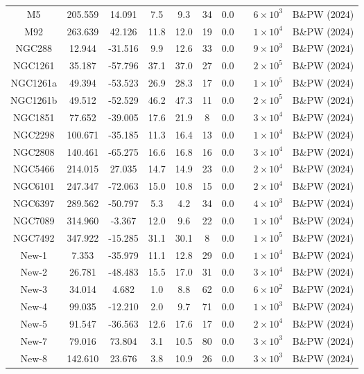 \begin{table}
\begin{tabular}{cSSSSSSccc}
M5 & 205.559 & 14.091 & 7.5 & 9.3 & 34 & 0.0 & \citet{ibata:2023} & $6 \times 10^{3}$ & B\&PW (2024) \\
M92 & 263.639 & 42.126 & 11.8 & 12.0 & 19 & 0.0 & \citet{ibata:2023} & $1 \times 10^{4}$ & B\&PW (2024) \\
NGC288 & 12.944 & -31.516 & 9.9 & 12.6 & 33 & 0.0 & \citet{ibata:2023} & $9 \times 10^{3}$ & B\&PW (2024) \\
NGC1261 & 35.187 & -57.796 & 37.1 & 37.0 & 27 & 0.0 & \citet{ibata:2023} & $2 \times 10^{5}$ & B\&PW (2024) \\
NGC1261a & 49.394 & -53.523 & 26.9 & 28.3 & 17 & 0.0 & \citet{ibata:2023} & $1 \times 10^{5}$ & B\&PW (2024) \\
NGC1261b & 49.512 & -52.529 & 46.2 & 47.3 & 11 & 0.0 & \citet{ibata:2023} & $2 \times 10^{5}$ & B\&PW (2024) \\
NGC1851 & 77.652 & -39.005 & 17.6 & 21.9 & 8 & 0.0 & \citet{ibata:2023} & $3 \times 10^{4}$ & B\&PW (2024) \\
NGC2298 & 100.671 & -35.185 & 11.3 & 16.4 & 13 & 0.0 & \citet{ibata:2023} & $1 \times 10^{4}$ & B\&PW (2024) \\
NGC2808 & 140.461 & -65.275 & 16.6 & 16.8 & 16 & 0.0 & \citet{ibata:2023} & $3 \times 10^{4}$ & B\&PW (2024) \\
NGC5466 & 214.015 & 27.035 & 14.7 & 14.9 & 23 & 0.0 & \citet{ibata:2023} & $2 \times 10^{4}$ & B\&PW (2024) \\
NGC6101 & 247.347 & -72.063 & 15.0 & 10.8 & 15 & 0.0 & \citet{ibata:2023} & $2 \times 10^{4}$ & B\&PW (2024) \\
NGC6397 & 289.562 & -50.797 & 5.3 & 4.2 & 34 & 0.0 & \citet{ibata:2023} & $4 \times 10^{3}$ & B\&PW (2024) \\
NGC7089 & 314.960 & -3.367 & 12.0 & 9.6 & 22 & 0.0 & \citet{ibata:2023} & $1 \times 10^{4}$ & B\&PW (2024) \\
NGC7492 & 347.922 & -15.285 & 31.1 & 30.1 & 8 & 0.0 & \citet{ibata:2023} & $1 \times 10^{5}$ & B\&PW (2024) \\
New-1 & 7.353 & -35.979 & 11.1 & 12.8 & 29 & 0.0 & \citet{ibata:2023} & $1 \times 10^{4}$ & B\&PW (2024) \\
New-2 & 26.781 & -48.483 & 15.5 & 17.0 & 31 & 0.0 & \citet{ibata:2023} & $3 \times 10^{4}$ & B\&PW (2024) \\
New-3 & 34.014 & 4.682 & 1.0 & 8.8 & 62 & 0.0 & \citet{ibata:2023} & $6 \times 10^{2}$ & B\&PW (2024) \\
New-4 & 99.035 & -12.210 & 2.0 & 9.7 & 71 & 0.0 & \citet{ibata:2023} & $1 \times 10^{3}$ & B\&PW (2024) \\
New-5 & 91.547 & -36.563 & 12.6 & 17.6 & 17 & 0.0 & \citet{ibata:2023} & $2 \times 10^{4}$ & B\&PW (2024) \\
New-7 & 79.016 & 73.804 & 3.1 & 10.5 & 80 & 0.0 & \citet{ibata:2023} & $3 \times 10^{3}$ & B\&PW (2024) \\
New-8 & 142.610 & 23.676 & 3.8 & 10.9 & 26 & 0.0 & \citet{ibata:2023} & $3 \times 10^{3}$ & B\&PW (2024) \\
\hline \hline
\end{tabular}
\end{table}
